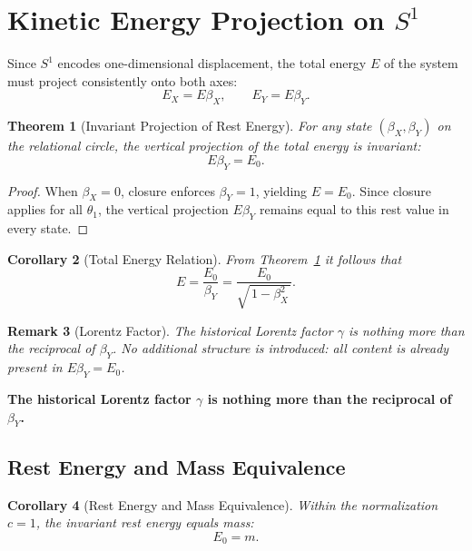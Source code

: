 \documentclass[12pt, a4paper]{article}
\newtheorem{theorem}{Theorem}[section]
\newtheorem{corollary}[theorem]{Corollary}
\newtheorem{remark}[theorem]{Remark}
\begin{document}
\section{Kinetic Energy Projection on $S^1$}

Since $S^{1}$ encodes one-dimensional displacement, the total energy $E$ of the system 
must project consistently onto both axes:
\[
E_{X} = E \beta_{X}, 
\qquad 
E_{Y} = E \beta_{Y}.
\]

\begin{theorem}[Invariant Projection of Rest Energy]
\label{thm:restenergy}
For any state $(\beta_X,\beta_Y)$ on the relational circle, the vertical projection of the total energy is invariant:
\[
E \beta_Y = E_0.
\]
\end{theorem}

\begin{proof}
When $\beta_X=0$, closure enforces $\beta_Y=1$, yielding $E=E_0$. 
Since closure applies for all $\theta_1$, the vertical projection $E\beta_Y$ 
remains equal to this rest value in every state.
\end{proof}

\begin{corollary}[Total Energy Relation]
\label{cor:totalE}
From Theorem~\ref{thm:restenergy} it follows that
\[
E = \frac{E_0}{\beta_Y} 
= \frac{E_0}{\sqrt{\,1-\beta_X^2\,}}.
\]
\end{corollary}

\begin{remark}[Lorentz Factor]
The historical Lorentz factor $\gamma$ is nothing more than the reciprocal of $\beta_Y$. 
No additional structure is introduced: all content is already present in $E\beta_Y=E_0$.
\end{remark}

\begin{tcolorbox}[colback=gray!5, colframe=black!80!black, title=Summary:]
\textbf{The historical Lorentz factor $\gamma$ is nothing more than the reciprocal of $\beta_Y$.}
\end{tcolorbox}

\subsection{Rest Energy and Mass Equivalence}

\begin{corollary}[Rest Energy and Mass Equivalence]
\label{cor:restmass}
Within the normalization $c=1$, the invariant rest energy equals mass:
\[
E_{0} = m.
\]
\end{corollary}
\end{document}

